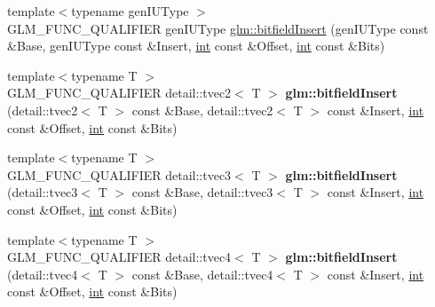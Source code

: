 \begin{DoxyCompactItemize}
\item 
{\footnotesize template$<$typename gen\+I\+U\+Type $>$ }\\G\+L\+M\+\_\+\+F\+U\+N\+C\+\_\+\+Q\+U\+A\+L\+I\+F\+I\+E\+R gen\+I\+U\+Type \hyperlink{group__core__func__integer_ga7ab09972d52094d97d2480982e657dd0}{glm\+::bitfield\+Insert} (gen\+I\+U\+Type const \&Base, gen\+I\+U\+Type const \&Insert, \hyperlink{_s_d_l__thread_8h_a6a64f9be4433e4de6e2f2f548cf3c08e}{int} const \&Offset, \hyperlink{_s_d_l__thread_8h_a6a64f9be4433e4de6e2f2f548cf3c08e}{int} const \&Bits)
\item 
\hypertarget{namespaceglm_a13eb4b03e07aff8b95d59079ba5790e3}{}{\footnotesize template$<$typename T $>$ }\\G\+L\+M\+\_\+\+F\+U\+N\+C\+\_\+\+Q\+U\+A\+L\+I\+F\+I\+E\+R detail\+::tvec2$<$ T $>$ {\bfseries glm\+::bitfield\+Insert} (detail\+::tvec2$<$ T $>$ const \&Base, detail\+::tvec2$<$ T $>$ const \&Insert, \hyperlink{_s_d_l__thread_8h_a6a64f9be4433e4de6e2f2f548cf3c08e}{int} const \&Offset, \hyperlink{_s_d_l__thread_8h_a6a64f9be4433e4de6e2f2f548cf3c08e}{int} const \&Bits)\label{namespaceglm_a13eb4b03e07aff8b95d59079ba5790e3}

\item 
\hypertarget{namespaceglm_ac46b5eb28b597fb612dd0cc982bc97de}{}{\footnotesize template$<$typename T $>$ }\\G\+L\+M\+\_\+\+F\+U\+N\+C\+\_\+\+Q\+U\+A\+L\+I\+F\+I\+E\+R detail\+::tvec3$<$ T $>$ {\bfseries glm\+::bitfield\+Insert} (detail\+::tvec3$<$ T $>$ const \&Base, detail\+::tvec3$<$ T $>$ const \&Insert, \hyperlink{_s_d_l__thread_8h_a6a64f9be4433e4de6e2f2f548cf3c08e}{int} const \&Offset, \hyperlink{_s_d_l__thread_8h_a6a64f9be4433e4de6e2f2f548cf3c08e}{int} const \&Bits)\label{namespaceglm_ac46b5eb28b597fb612dd0cc982bc97de}

\item 
\hypertarget{namespaceglm_a84dd7fb4a6325934c77f005416b56eb8}{}{\footnotesize template$<$typename T $>$ }\\G\+L\+M\+\_\+\+F\+U\+N\+C\+\_\+\+Q\+U\+A\+L\+I\+F\+I\+E\+R detail\+::tvec4$<$ T $>$ {\bfseries glm\+::bitfield\+Insert} (detail\+::tvec4$<$ T $>$ const \&Base, detail\+::tvec4$<$ T $>$ const \&Insert, \hyperlink{_s_d_l__thread_8h_a6a64f9be4433e4de6e2f2f548cf3c08e}{int} const \&Offset, \hyperlink{_s_d_l__thread_8h_a6a64f9be4433e4de6e2f2f548cf3c08e}{int} const \&Bits)\label{namespaceglm_a84dd7fb4a6325934c77f005416b56eb8}


\end{DoxyCompactItemize}
